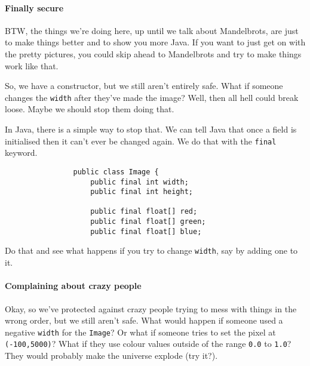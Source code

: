 \documentclass{article}
\begin{document}
        \paragraph{Finally secure}
            BTW, the things we're doing here, up until we talk about Mandelbrots, are just to make things better and to show you more Java.
            If you want to just get on with the pretty pictures, you could skip ahead to Mandelbrots and try to make things work like that.
            
            So, we have a constructor, but we still aren't entirely safe. What if someone changes the \texttt{width} after they've made the
            image? Well, then all hell could break loose. Maybe we should stop them doing that.
            
            In Java, there is a simple way to stop that. We can tell Java that once a field is initialised then it can't ever be changed
            again. We do that with the \texttt{final} keyword.

            \begin{verbatim}
                public class Image {
                    public final int width;
                    public final int height;
    
                    public final float[] red;
                    public final float[] green;
                    public final float[] blue;    
            \end{verbatim}
            
            Do that and see what happens if you try to change \texttt{width}, say by adding one to it.
            
        \paragraph{Complaining about crazy people}
            Okay, so we've protected against crazy people trying to mess with things in the wrong order, but we still aren't safe. What
            would happen if someone used a negative \texttt{width} for the \texttt{Image}? Or what if someone tries to set the pixel at
            \texttt{(-100,5000)}? What if they use colour values outside of the range \texttt{0.0} to \texttt{1.0}? They would probably
            make the universe explode (try it?).
            
\end{document}
